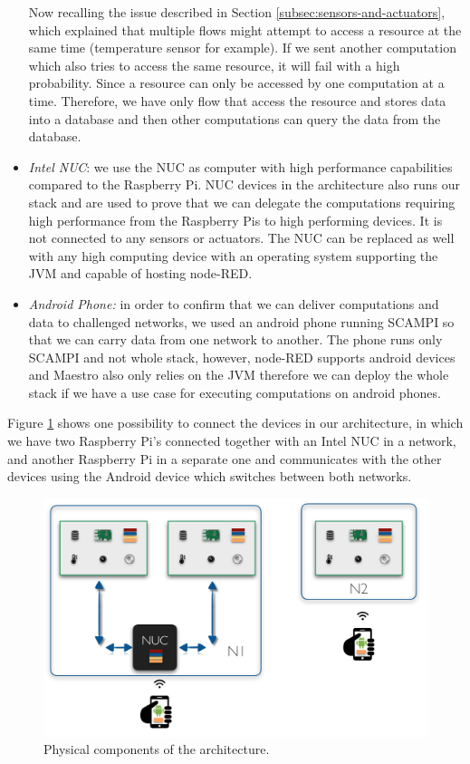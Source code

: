 \begin{itemize}
\noindent Now recalling the issue described in Section \ref{subsec:sensors-and-actuators}, which explained that multiple flows might attempt to access a resource at the same time (temperature sensor for example). If we sent another computation which also tries to access the same resource, it will fail with a high probability. Since a resource can only be accessed by one computation at a time. Therefore, we have only flow that access the resource and stores data into a database and then other computations can query the data from the database.

\item \textit{Intel NUC}: we use the NUC as computer with high performance capabilities compared  to the Raspberry Pi. NUC devices in the architecture also runs our stack and  are used to prove that we can delegate the computations requiring high performance from the Raspberry Pis to high performing devices. It is not connected to any sensors or actuators. The NUC can be replaced as well with any high computing device with an operating system supporting the JVM  and capable of hosting node-RED. 

\item\textit{Android Phone:} in order to confirm that we can deliver computations and data to challenged networks, we used an android phone running SCAMPI so that we can carry data from one network to another. The phone runs only SCAMPI and not whole stack, however, node-RED supports android devices and Maestro also only relies on the JVM therefore we can deploy the whole stack if we have a use case for executing computations on android phones.

\end{itemize}

\noindent Figure \ref{fig:components} shows one possibility to connect the devices in our architecture, in which we have two Raspberry Pi's connected together with an Intel NUC in a network, and another Raspberry Pi in a separate one and communicates with the other devices using the Android device which switches between both networks.
\begin{figure}[H]
	\centering
	\includegraphics[scale=0.5]{images/components.png}
	\caption{Physical components of the architecture. }
	\label{fig:components}
\end{figure}


